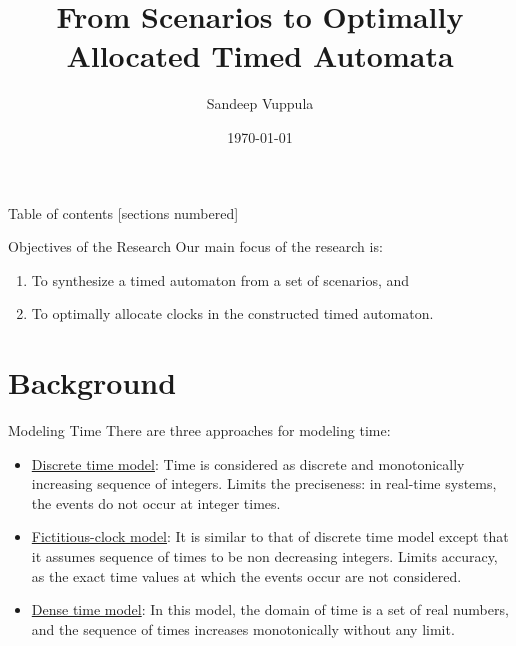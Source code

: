 \documentclass[10pt]{beamer}
\title{From Scenarios to Optimally Allocated Timed Automata}
\date{\today}
\author{Sandeep Vuppula}
\institute{University of Minnesota Duluth}
\theoremstyle{plain}
\theoremstyle{definition}
\begin{document}
\maketitle

\begin{frame}{Table of contents}
  [sections numbered]
  \tableofcontents[hideallsubsections]
\end{frame}

\begin{frame}{Objectives of the Research}
	Our main focus of the research is:
	\begin{enumerate}
		\item	To synthesize a timed automaton from a set of scenarios, and
		\item	To optimally allocate clocks in the constructed timed automaton.
	\end{enumerate}
\end{frame}

\section{Background}


\begin{frame}{Modeling Time}
	There are three approaches for modeling time:
	\begin{itemize}		
		\item \underline{Discrete time model}: Time is considered as discrete and monotonically increasing sequence of integers. Limits the preciseness: in real-time systems, the events do not occur at integer times.
		\item \underline{Fictitious-clock model}: It is similar to that of discrete time model except that it assumes sequence of times to be non decreasing integers. Limits accuracy, as the exact time values at which the events occur are not considered. 
		\item \underline{Dense time model}: In this model, the domain of time is a set of real numbers, and the sequence of times increases monotonically without any limit. %
	\end{itemize}
\end{frame}
\end{document}

